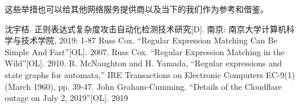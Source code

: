 \documentclass[hyperref,UTF8,12pt,a4paper]{ctexart}
\begin{document}
这些举措也可以给其他网络服务提供商以及当下的我们作为参考和借鉴。

\newpage



\begin{thebibliography}{99}
 沈宇桔. 正则表达式复杂度攻击自动化检测技术研究[D]. 南京: 南京大学计算机科学与技术学院, 2019: 1-87
 Russ Cox. “Regular Expression Matching Can Be Simple And Fast”[OL]. 2007.
 Russ Cox. “Regular Expression Matching in the Wild”[OL]. 2010.
 R. McNaughton and H. Yamada, “Regular expressions and state graphs for automata,” IRE Transactions on Electronic Computers EC-9(1) (March 1960), pp. 39-47.
 John Graham-Cumming. “Details of the Cloudflare outage on July 2, 2019”[OL]. 2019
\end {thebibliography}
\end{document}
